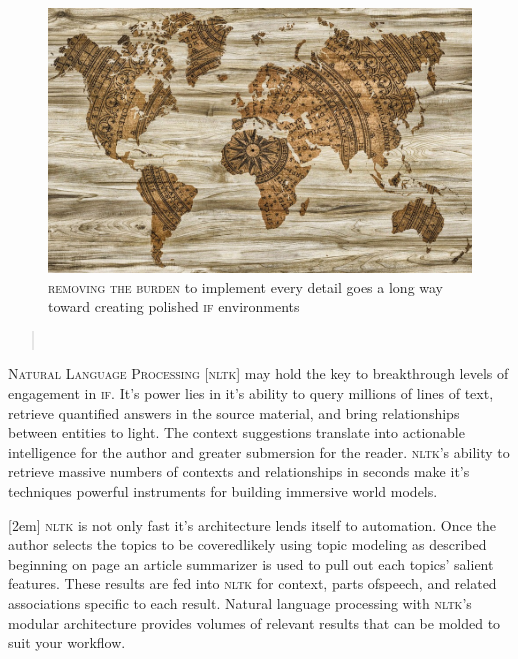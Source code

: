 \begin{figure}[h]                                                           
 \includegraphics[width=\linewidth]{./media/images/world_map}%
  \scriptsize{\textsc{\\removing the burden} to implement every detail goes a
    long way toward creating polished \textsc{if} environments}
  \label{fig:editorial}%
\end{figure}                                                                

\begin{quotation} 
  \noindent{}\\[.5mm]
   \hfill{}
\end{quotation} 
\newpage
\lettrine[lines=3]{\color{BrickRed}N}{\enspace atural Language Processing}
[\textsc{nltk}] may hold the key to breakthrough levels of engagement in
\textsc{if}. It's power lies in it's ability to query
millions of lines of text, retrieve quantified answers in the source
material, and bring relationships between entities to light. The context
suggestions translate into actionable intelligence
for the author and greater submersion for the reader. \textsc{nltk}'s
ability to retrieve massive numbers of contexts and relationships in seconds
make it's techniques powerful instruments for building immersive world models.

[2em]
\textsc{nltk} is not only fast it's architecture lends itself to automation.
Once the author selects the topics to be covered\textemdash likely using topic modeling
as described beginning on page \pageref{sec:topic}\textemdash an article summarizer is
used to pull out each topics' salient features.
These results are fed into \textsc{nltk} for context, parts\textendash
of\textendash speech, and related associations specific to each result. Natural
language processing with \textsc{nltk}'s modular architecture provides volumes of
relevant results that can be molded to suit your workflow.


